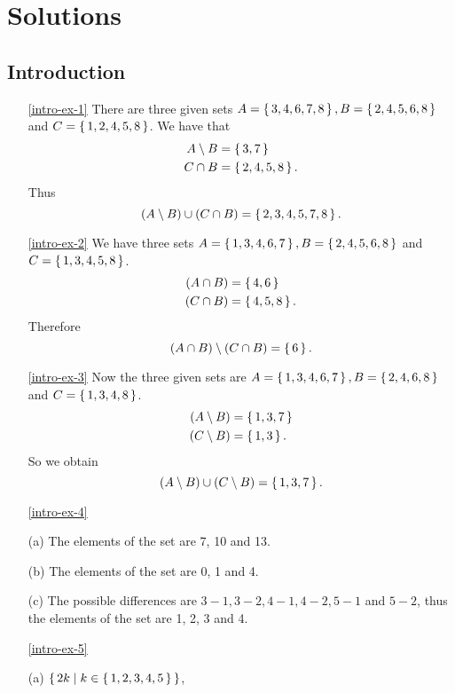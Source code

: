 
\chapter{Solutions}\label{cha:solutions}

\section{Introduction}
\begin{enumerate}
\item[\ref{intro-ex-1}]
There are three given sets $A=\left\{\,3,4,6,7,8\,\right\},B=\left\{\,2,4,5,6,8\,\right\}$ and $C=\left\{\,1,2,4,5,8\,\right\}$. 
We have that
\begin{align*}
A\setminus B&=\left\{\,3,7\,\right\}\\
C\cap B&=\left\{\,2,4,5,8\,\right\}.
\end{align*}
Thus 
$$
(A\setminus B)\cup(C\cap B)=\left\{\,2,3,4,5,7,8\,\right\}.
$$

\item[\ref{intro-ex-2}]
We have three sets $A=\left\{\,1,3,4,6,7\,\right\},B=\left\{\,2,4,5,6,8\,\right\}$ and $C=\left\{\,1,3,4,5,8\,\right\}$. 
\begin{align*}
(A\cap B)&=\left\{\,4,6\,\right\}\\
(C\cap B)&=\left\{\,4,5,8\,\right\}.
\end{align*}
Therefore
$$
(A\cap B)\setminus(C\cap B)=\left\{\,6\,\right\}.
$$

\item[\ref{intro-ex-3}]
Now the three given sets are $A=\left\{\,1,3,4,6,7\,\right\},B=\left\{\,2,4,6,8\,\right\}$ and $C=\left\{\,1,3,4,8\,\right\}$. 
\begin{align*}
(A\setminus B)&=\left\{\,1,3,7\,\right\}\\
(C\setminus B)&=\left\{\,1,3\,\right\}.
\end{align*}
So we obtain
$$
(A\setminus B)\cup(C\setminus B)=\left\{\,1,3,7\,\right\}.
$$

\item[\ref{intro-ex-4}]

(a) The elements of the set are 7, 10 and 13.

(b) The elements of the set are 0, 1 and 4.

(c) The possible differences are $3-1, 3-2, 4-1, 4-2, 5-1$ and $5-2$, thus the elements of the set are 1, 2, 3 and 4.

\item[\ref{intro-ex-5}]

(a) $\left\{\,2k\mid  k\in\left\{\,1,2,3,4,5\,\right\}\,\right\}$, 


\end{enumerate}
